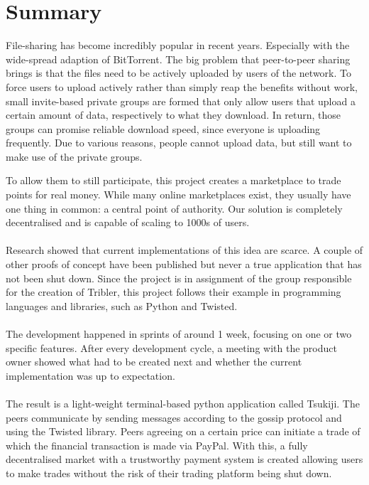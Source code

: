 \section{Summary} 
File-sharing has become incredibly popular in recent years. 
Especially with the wide-spread adaption of BitTorrent. 
The big problem that peer-to-peer sharing brings is that the files need to be actively uploaded by users of the network.
To force users to upload actively rather than simply reap the benefits without work, small invite-based private groups are formed that only allow users that upload a certain amount of data, respectively to what they download.
In return, those groups can promise reliable download speed, since everyone is uploading frequently.
Due to various reasons, people cannot upload data, but still want to make use of the private groups.

To allow them to still participate, this project creates a marketplace to trade points for real money.
While many online marketplaces exist, they usually have one thing in common: a central point of authority.
Our solution is completely decentralised and is capable of scaling to 1000s of users.\\
\\
Research showed that current implementations of this idea are scarce.
A couple of other proofs of concept have been published but never a true application that has not been shut down.
Since the project is in assignment of the group responsible for the creation of Tribler, this project follows their example in programming languages and libraries, such as Python and Twisted.\\
\\
The development happened in sprints of around 1 week, focusing on one or two specific features.
After every development cycle, a meeting with the product owner showed what had to be created next and whether the current implementation was up to expectation.\\
\\
The result is a light-weight terminal-based python application called Tsukiji.
The peers communicate by sending messages according to the gossip protocol and using the Twisted library.
Peers agreeing on a certain price can initiate a trade of which the financial transaction is made via PayPal.
With this, a fully decentralised market with a trustworthy payment system is created allowing users to make trades without the risk of their trading platform being shut down.